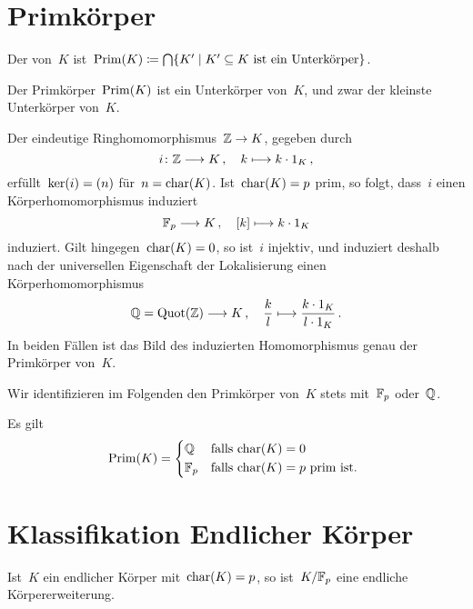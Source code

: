 \section{Primkörper}

\begin{definition}
  Der  von~$K$ ist~$\Prim(K) \defined \bigcap \{ K' \suchthat \text{$K' \subseteq K$ ist ein Unterkörper} \}$.
\end{definition}

\begin{proposition}
  Der Primkörper~$\operatorname{Prim}(K)$ ist ein Unterkörper von~$K$, und zwar der kleinste Unterkörper von~$K$.
\end{proposition}

Der eindeutige Ringhomomorphismus~$\Integer \to K$, gegeben durch
\[
  i
  \colon
  \Integer \to K \,,
  \quad
  k \mapsto k \cdot 1_K \,,
\]
erfüllt~$\ker(i) = (n)$ für~$n = \operatorname{char}(K)$.
Ist~$\operatorname{char}(K) = p$ prim, so folgt, dass~$i$ einen Körperhomomorphismus induziert
\[
  \Finite_p \to K \,,
  \quad
  \class{k} \mapsto k \cdot 1_K
\]
induziert.
Gilt hingegen~$\operatorname{char}(K) = 0$, so ist~$i$ injektiv, und induziert deshalb nach der universellen Eigenschaft der Lokalisierung einen Körperhomomorphismus
\[
  \Rational
  =
  \Quot( \Integer )
  \to
  K \,,
  \quad
  \frac{k}{l}
  \mapsto
  \frac{k \cdot 1_K}{l \cdot 1_K} \,.
\]
In beiden Fällen ist das Bild des induzierten Homomorphismus genau der Primkörper von~$K$.

Wir identifizieren im Folgenden den Primkörper von~$K$ stets mit~$\mathbb{F}_p$ oder~$\mathbb{Q}$.

\begin{corollary}
  Es gilt
  \[
    \Prim(K)
    =
    \begin{cases*}
      \Rational
      &
      falls~$\ringchar(K) = 0$
      \\
      \Finite_p
      &
      falls~$\ringchar(K) = p$ prim ist.
    \end{cases*}
  \]
\end{corollary}





\section{Klassifikation Endlicher Körper}


Ist~$K$ ein endlicher Körper mit~$\operatorname{char}(K) = p$, so ist~$K / \mathbb{F}_p$ eine endliche Körpererweiterung.


